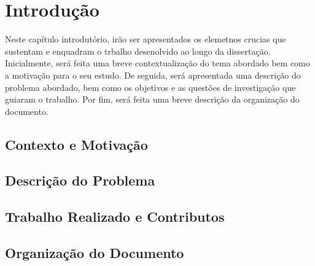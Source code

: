 
%

\chapter{Introdução}
\label{cha:introducao}

Neste capítulo introdutório, irão ser apresentados os elemetnos crucias que sustentam e enquadram o trbalho desenolvido ao longo da dissertação. Inicialmente, será feita uma breve contextualização do tema abordado bem como a motivação para o seu estudo. De seguida, será apresentada uma descrição do problema abordado, bem como os objetivos e as questões de investigação que guiaram o trabalho. Por fim, será feita uma breve descrição da organização do documento.

\section{Contexto e Motivação}
\label{sec:cont_e_motiv}

\section{Descrição do Problema}
\label{sec:des_problema}

\section{Trabalho Realizado e Contributos}
\label{sec:contribuicoes}

\section{Organização do Documento}
\label{sec:organizacao}

